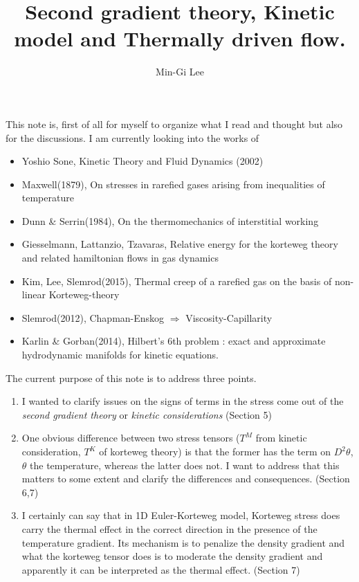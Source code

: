 \documentclass[a4paper,12pt]{article}
\title{Second gradient theory, Kinetic model and Thermally driven flow.}
\author{Min-Gi Lee}
\begin{document}
\maketitle

\begin{abstract}

\end{abstract}

This note is, first of all for myself to organize what I read and thought but also for the discussions. I am currently looking into the works of
\begin{itemize}
 \item Yoshio Sone, Kinetic Theory and Fluid Dynamics (2002)
 \item Maxwell(1879), On stresses in rarefied gases arising from inequalities of temperature
 \item Dunn \& Serrin(1984), On the thermomechanics of interstitial working
 \item Giesselmann, Lattanzio, Tzavaras, Relative energy for the korteweg theory and related hamiltonian flows in gas dynamics
 \item Kim, Lee, Slemrod(2015), Thermal creep of a rarefied gas on the basis of non-linear Korteweg-theory
 \item Slemrod(2012), Chapman-Enskog $\Rightarrow$ Viscosity-Capillarity
 \item Karlin \& Gorban(2014), Hilbert's 6th problem : exact and approximate hydrodynamic manifolds for kinetic equations.
\end{itemize}

The current purpose of this note is to address three points.
\begin{enumerate}
 \item I wanted to clarify issues on the signs of terms in the stress come out of the {\it second gradient theory} or {\it kinetic considerations} (Section 5)
 \item One obvious difference between two stress tensors ($T^M$ from kinetic consideration, $T^K$ of korteweg theory) is that the former has the term on $D^2\theta$, $\theta$ the temperature, whereas the latter does not. I want to address that this matters to some extent and clarify the differences and consequences. (Section 6,7)
 \item I certainly can say that in 1D Euler-Korteweg model, Korteweg stress does carry the thermal effect in the correct direction in the presence of the temperature gradient. Its mechanism is to penalize the density gradient and what the korteweg tensor does is to moderate the density gradient and apparently it can be interpreted as the thermal effect. (Section 7)
\end{enumerate}
\end{document}

